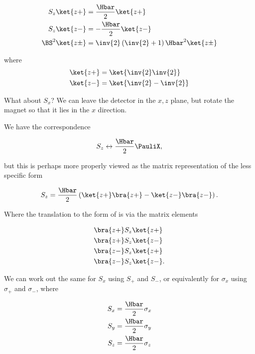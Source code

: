 \begin{align}\label{eqn:PHY356Foct19:2005}
S_z \ket{z+} &= \frac{\Hbar}{2} \ket{z+} \\
S_z \ket{z-} &= -\frac{\Hbar}{2} \ket{z-} \\
\BS^2 \ket{z\pm} &= \inv{2} \left( \inv{2} + 1 \right) \Hbar^2 \ket{z\pm}
\end{align}

where
\begin{align}\label{eqn:PHY356Foct19:2006}
\ket{z+} &= \ket{ \inv{2} \inv{2} } \\
\ket{z-} &= \ket{ \inv{2} -\inv{2} }
\end{align}


What about $S_x$?  We can leave the detector in the $x,z$ plane, but rotate the magnet so that it lies in the $x$ direction.

We have the correspondence

\begin{align}\label{eqn:PHY356Foct19:2007}
S_z \leftrightarrow \frac{\Hbar}{2} \PauliX,
\end{align}

but this is perhaps more properly viewed as the matrix representation of the less specific form

\begin{align}\label{eqn:PHY356Foct19:2008}
S_z = \frac{\Hbar}{2} \left(
\ket{z+} \bra{z+}
-\ket{z-} \bra{z-}
\right).
\end{align}

Where the translation to the form of  is via the matrix elements

\begin{align}\label{eqn:PHY356Foct19:2020}
&\bra{z+} S_z \ket{z+} \\
&\bra{z+} S_z \ket{z-} \\
&\bra{z-} S_z \ket{z+} \\
&\bra{z-} S_z \ket{z-}.
\end{align}

We can work out the same for $S_x$ using $S_{+}$ and $S_{-}$, or equivalently for $\sigma_x$ using $\sigma_{+}$ and $\sigma_{-}$, where

\begin{align}\label{eqn:PHY356Foct19:2009}
S_x &= \frac{\Hbar}{2} \sigma_x \\
S_y &= \frac{\Hbar}{2} \sigma_y \\
S_z &= \frac{\Hbar}{2} \sigma_z
\end{align}

